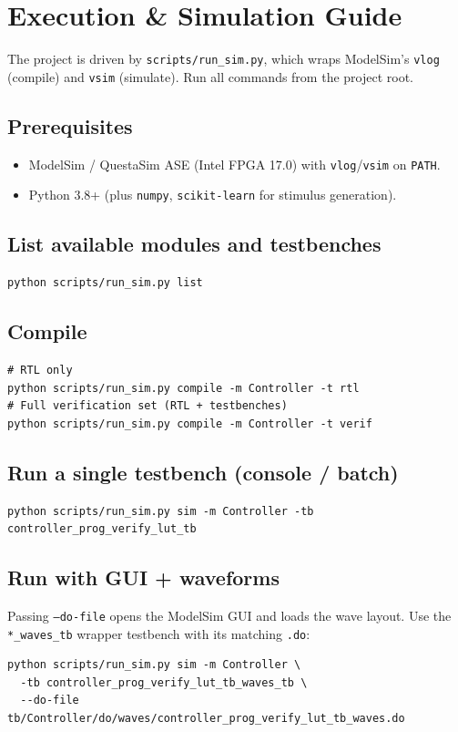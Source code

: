 \documentclass[11pt,a4paper]{article}
\begin{document}
\section{Execution \& Simulation Guide}

The project is driven by \texttt{scripts/run\_sim.py}, which wraps ModelSim's
\texttt{vlog} (compile) and \texttt{vsim} (simulate). Run all commands from the
project root.

\subsection{Prerequisites}
\begin{itemize}[leftmargin=1.4em]
  \item ModelSim / QuestaSim ASE (Intel FPGA 17.0) with \texttt{vlog}/\texttt{vsim} on \texttt{PATH}.
  \item Python 3.8+ (plus \texttt{numpy}, \texttt{scikit-learn} for stimulus generation).
\end{itemize}

\subsection{List available modules and testbenches}
\begin{lstlisting}[style=shell]
python scripts/run_sim.py list
\end{lstlisting}

\subsection{Compile}
\begin{lstlisting}[style=shell]
# RTL only
python scripts/run_sim.py compile -m Controller -t rtl
# Full verification set (RTL + testbenches)
python scripts/run_sim.py compile -m Controller -t verif
\end{lstlisting}

\subsection{Run a single testbench (console / batch)}
\begin{lstlisting}[style=shell]
python scripts/run_sim.py sim -m Controller -tb controller_prog_verify_lut_tb
\end{lstlisting}

\subsection{Run with GUI + waveforms}
Passing \texttt{--do-file} opens the ModelSim GUI and loads the wave layout.
Use the \texttt{*\_waves\_tb} wrapper testbench with its matching \texttt{.do}:
\begin{lstlisting}[style=shell]
python scripts/run_sim.py sim -m Controller \
  -tb controller_prog_verify_lut_tb_waves_tb \
  --do-file tb/Controller/do/waves/controller_prog_verify_lut_tb_waves.do
\end{lstlisting}
\end{document}

